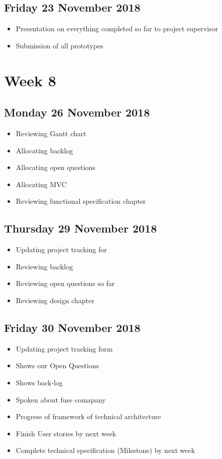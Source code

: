 \subsection*{Friday 23 November 2018}
\begin{itemize}
	\item Presentation on everything completed so far to project supervisor
	\item Submission of all prototypes
\end{itemize}

\section*{Week 8}
\subsection*{Monday 26 November 2018}
\begin{itemize}
	\item Reviewing Gantt chart
	\item Allocating backlog
	\item Allocating open questions
	\item Allocating MVC
	\item Reviewing functional specification chapter
\end{itemize}

\subsection*{Thursday 29 November 2018}
\begin{itemize}
	\item Updating project tracking for
	\item Reviewing backlog
	\item Reviewing open questions so far
	\item Reviewing design chapter
\end{itemize}

\subsection*{Friday 30 November 2018}
\begin{itemize}
	\item Updating project tracking form
	\item Shows our Open Questions
	\item Shows back-log
	\item Spoken about fuse comapany
	\item Progress of framework of technical architecture
	\item Finish User stories by next week
	\item Complete technical specification (Milestone) by next week
\end{itemize}

